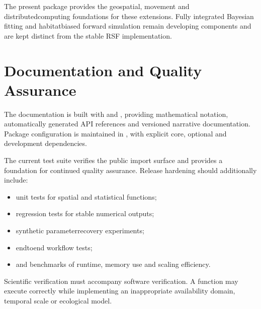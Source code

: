 \documentclass[letterpaper,10pt,english]{sphinxmanual}
\begin{document}
\sphinxAtStartPar
The present package provides the geospatial, movement and distributed\sphinxhyphen{}computing foundations for these extensions. Fully integrated Bayesian fitting and habitat\sphinxhyphen{}biased forward simulation remain developing components and are kept distinct from the stable RSF implementation.


\section{Documentation and Quality Assurance}
\label{\detokenize{implementation:documentation-and-quality-assurance}}
\sphinxAtStartPar
The documentation is built with  and , providing mathematical notation, automatically generated API references and versioned narrative documentation. Package configuration is maintained in , with explicit core, optional and development dependencies.

\sphinxAtStartPar
The current test suite verifies the public import surface and provides a foundation for continued quality assurance. Release hardening should additionally include:
\begin{itemize}
\item {} 
\sphinxAtStartPar
unit tests for spatial and statistical functions;

\item {} 
\sphinxAtStartPar
regression tests for stable numerical outputs;

\item {} 
\sphinxAtStartPar
synthetic parameter\sphinxhyphen{}recovery experiments;

\item {} 
\sphinxAtStartPar
end\sphinxhyphen{}to\sphinxhyphen{}end workflow tests;

\item {} 
\sphinxAtStartPar
and benchmarks of runtime, memory use and scaling efficiency.

\end{itemize}

\sphinxAtStartPar
Scientific verification must accompany software verification. A function may execute correctly while implementing an inappropriate availability domain, temporal scale or ecological model.
\end{document}
